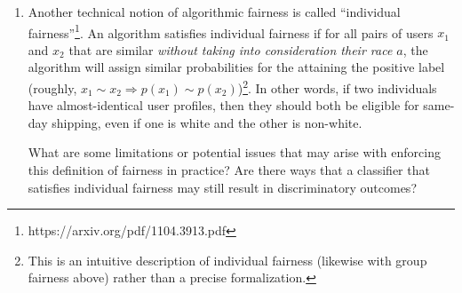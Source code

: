 \documentclass[submit]{harvardml}
\begin{document}
\begin{problem}
\begin{enumerate}
    \item Another technical notion of algorithmic fairness is called ``individual fairness''\footnote{https://arxiv.org/pdf/1104.3913.pdf}. An algorithm satisfies individual fairness if for all pairs of users $x_1$ and $x_2$ that are similar \emph{without taking into consideration their race $a$}, the algorithm will assign similar probabilities for the attaining the positive label (roughly, $x_1 \sim x_2 \Rightarrow p(x_1) \sim p(x_2)$)\footnote{This is an intuitive description of individual fairness (likewise with group fairness above) rather than a precise formalization.}.  In other words, if two individuals have almost-identical user profiles, then they should both be eligible for same-day shipping, even if one is white and the other is non-white.
    
    What are some limitations or potential issues that may arise with enforcing this definition of fairness in practice?  Are there ways that a classifier that satisfies individual fairness may still result in discriminatory outcomes?
    
\end{enumerate}

\end{problem}
\end{document}
